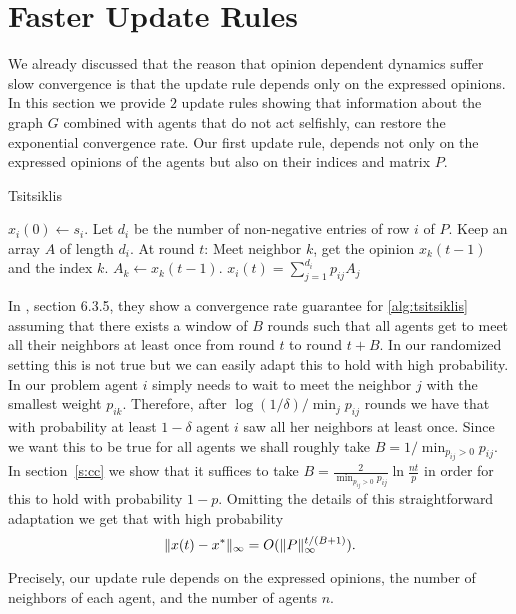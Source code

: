 \section{Faster Update Rules}\label{s:graph_aware}

We already discussed that the reason that opinion dependent dynamics suffer slow
convergence is that the update rule depends only on the expressed opinions.
In this section we provide $2$ update rules showing that information about the
graph $G$ combined with agents that do not act selfishly,
can restore the exponential convergence rate.
Our first update rule, depends not only on the expressed opinions of the
agents but also on their indices and matrix $P$.
\begin{algorithm}
  \caption{Tsitsiklis}
  \label{alg:tsitsiklis}
  \begin{algorithmic}[1]
    \STATE $x_i(0) \gets s_i$.
    \STATE Let $d_i$ be the number of non-negative entries of row $i$ of $P$.
    \STATE Keep an array $A$ of length $d_i$.
    \STATE At round $t$:
    \bindent
    \STATE Meet neighbor $k$, get the opinion $x_k(t-1)$ and the index $k$.
    \STATE $A_k \gets x_k(t-1)$.
    \STATE $x_i(t) = \sum_{j=1}^{d_i} p_{ij} A_j$
    \eindent
\end{algorithmic}
\end{algorithm}

In \cite{BT97}, section 6.3.5, they show a convergence rate guarantee for
\ref{alg:tsitsiklis} assuming that there exists
a window of $B$ rounds such that all agents get to meet all their
neighbors at least once from round $t$ to round $t+B$.
In our randomized setting this is not true but we can easily adapt this to
hold with high probability. In our problem
agent $i$ simply needs to wait to meet the neighbor $j$ with the smallest
weight $p_{ik}$. Therefore, after $\log(1/\delta)/\min_{j} p_{ij}$ rounds
we have that with probability at least $1-\delta$ agent $i$ saw all her
neighbors at least once.  Since we want this to be true for all agents
we shall roughly take $B = 1/\min_{p_{ij} > 0} {p_{ij}}$.
In section~\ref{s:cc} we show that it suffices to take $B = \frac{2}{\min_{p_{ij} > 0} {p_{ij}}}\ln\frac{nt}{p}$
in order for this to hold with probability $1-p$. 
Omitting the details of this straightforward adaptation
we get that with high probability
\[
  \| x(t) - x^* \|_{\infty} = O(\| P \|_{\infty}^{t/(B+1)}).
\]

Precisely, our update rule depends on the expressed opinions, the number of
neighbors of each agent, and the number of agents $n$.

